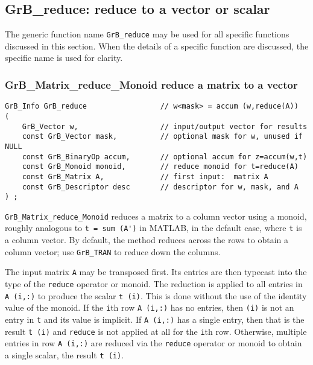 \documentclass[12pt]{article}
\begin{document}
\newpage
\subsection{{\sf GrB\_reduce:} reduce to a vector or scalar} %
\label{reduce}

The generic function name \verb'GrB_reduce' may be used for all specific
functions discussed in this section.  When the details of a specific function
are discussed, the specific name is used for clarity.

\subsubsection{{\sf GrB\_Matrix\_reduce\_Monoid} reduce a matrix to a vector}
\label{reduce_to_vector}

\begin{mdframed}[userdefinedwidth=6in]
{\footnotesize
\begin{verbatim}
GrB_Info GrB_reduce                 // w<mask> = accum (w,reduce(A))
(
    GrB_Vector w,                   // input/output vector for results
    const GrB_Vector mask,          // optional mask for w, unused if NULL
    const GrB_BinaryOp accum,       // optional accum for z=accum(w,t)
    const GrB_Monoid monoid,        // reduce monoid for t=reduce(A)
    const GrB_Matrix A,             // first input:  matrix A
    const GrB_Descriptor desc       // descriptor for w, mask, and A
) ;
\end{verbatim} } \end{mdframed}

\verb'GrB_Matrix_reduce_Monoid'
reduces a matrix to a column vector using a monoid, roughly analogous
to \verb"t = sum (A')" in MATLAB, in the default case, where \verb't' is a
column vector.  By default, the method reduces across the rows to
obtain a column vector; use \verb'GrB_TRAN' to reduce down the columns.

The input matrix \verb'A' may be transposed first.  Its entries are then
typecast into the type of the \verb'reduce' operator or monoid.  The reduction
is applied to all entries in \verb'A (i,:)' to produce the scalar \verb't (i)'.
This is done without the use of the identity value of the monoid.  If the
\verb'i'th row \verb'A (i,:)' has no entries, then \verb'(i)' is not an entry
in \verb't' and its value is implicit.  If \verb'A (i,:)' has a single entry,
then that is the result \verb't (i)' and \verb'reduce' is not applied at all
for the \verb'i'th row.  Otherwise, multiple entries in row \verb'A (i,:)' are
reduced via the \verb'reduce' operator or monoid to obtain a single scalar,
the result \verb't (i)'.
\end{document}
